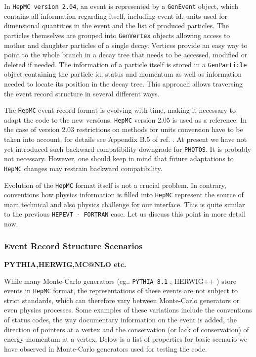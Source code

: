 \documentclass[]{Photos_interface_design}
\begin{document}
In {\tt HepMC version 2.04}, an  event is represented by a {\tt GenEvent} object,
which contains all information regarding itself, including event id,
units used for dimensional quantities in the event and the list of produced particles. The particles
themselves are grouped into {\tt GenVertex} objects allowing access to mother
and daughter particles of a single decay. Vertices provide an easy way
to point to the whole branch in a decay tree that needs to be accessed,
modified or deleted if needed. The information of a particle  itself is stored
in a {\tt GenParticle} object containing the particle id, status and momentum
as well as information needed to locate its position in the decay tree.
This approach allows traversing the event record structure in several different
ways.

The {\tt HepMC} event record format is  evolving with time, making it necessary
 to adapt
the code to the new versions.
{\tt HepMC} version 2.05 is used as a reference. In the case of version 2.03 restrictions on methods for 
units
conversion have to be taken into account, for details see Appendix B.5
of ref. \cite{Davidson:2010rw}. At present we have not yet introduced such 
backward compatibility downgrade for {\tt PHOTOS}. It is probably not necessary.
However,
one should keep in mind that future adaptations to {\tt HepMC} changes may restrain
backward compatibility.

Evolution of the {\tt HepMC} format itself is not a crucial problem.
In contrary, conventions how physics information is  filled into {\tt HepMC}
 represent the source of main technical and also physics 
challenge for our interface. 
This is quite similar to the previous
{\tt HEPEVT - FORTRAN} case. Let us discuss this point in more detail now.

\subsubsection{Event Record Structure Scenarios}

{\bf PYTHIA,HERWIG,MC@NLO etc. }

While many Monte-Carlo generators (eg.. {\tt PYTHIA 8.1} \cite{Sjostrand:2007gs}, 
HERWIG++ \cite{Bahr:2008pv})
store events in {\tt HepMC} format, the  representations of
these events are not subject to strict standards,  which can therefore
vary between Monte-Carlo generators or even physics processes. Some examples
of these variations include the conventions of status codes, the  way
documentary information on the event is added, the direction of pointers at a vertex
and the conservation (or lack of conservation) of energy-momentum at a vertex.
Below is a list of properties for basic scenario we have observed in Monte-Carlo
generators used for testing the code.
\end{document}
